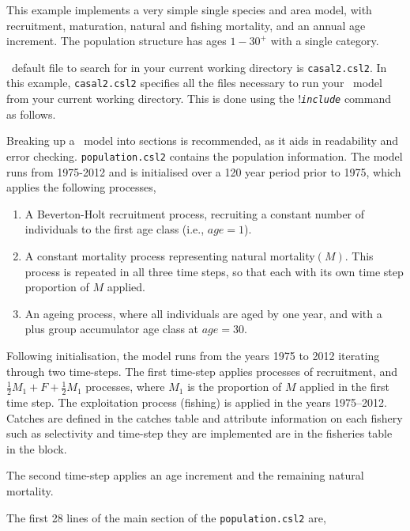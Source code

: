 This example implements a very simple single species and area model, with recruitment, maturation, natural and fishing mortality, and an annual age increment. The population structure has ages $1-30^{+}$ with a single category.

\CNAME\ default file to search for in your current working directory is \texttt{casal2.csl2}. In this example, \texttt{casal2.csl2} specifies all the files necessary to run your \CNAME\ model from your current working directory. This is done using the !\texttt{\emph{include}} command as follows.
 

Breaking up a \CNAME\ model into sections is recommended, as it aids in readability and error checking. \texttt{population.csl2} contains the population information. The model runs from 1975-2012 and is initialised over a 120 year period prior to  1975, which applies the following processes,

\begin{enumerate}
\item A Beverton-Holt recruitment process, recruiting a constant number of individuals to the first age class (i.e., $age=1$).
\item A constant mortality process representing natural mortality$(M)$. This process is repeated in all three time steps, so that each with its own time step proportion of $M$ applied.

\item An ageing process, where all individuals are aged by one year, and with a plus group accumulator age class at $age=30$.
\end{enumerate}

Following initialisation, the model runs from the years 1975 to 2012 iterating through two time-steps. The first time-step applies processes of recruitment, and  $\frac{1}{2} M_1 + F + \frac{1}{2} M_1$ processes, where $M_1$ is the proportion of $M$ applied in the first time step. The exploitation process (fishing) is applied in the years 1975--2012. Catches are defined in the catches table and attribute information on each fishery such as selectivity and time-step they are implemented are in the fisheries table in the  block.

The second time-step applies an age increment and the remaining natural mortality.

The first 28 lines of the main section of the \texttt{population.csl2} are,
 


